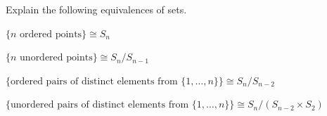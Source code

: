 \documentclass[11pt]{article}
\begin{document}
\begin{problem}
  Explain the following equivalences of sets.
  \begin{parts}

  \item $\{n \text{ ordered points}\} \cong S_n$
    \begin{solution}

    \end{solution}

  \item $\{n \text{ unordered points}\} \cong S_n/S_{n-1}$
    \begin{solution}

    \end{solution}

  \item $\{\text{ordered pairs of distinct elements from } \{1,\dots,n\}\}
    \cong S_n/S_{n-2}$
    \begin{solution}

    \end{solution}

  \item $\{\text{unordered pairs of distinct elements from } \{1,\dots,n\}\}
    \cong S_n/(S_{n-2}\times S_2)$
    \begin{solution}

    \end{solution}

  \end{parts}
\end{problem}
\newpage
\end{document}
